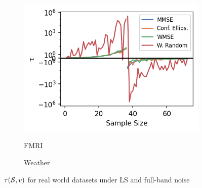 {\begin{figure}
    \centering
    \begin{subfigure}{0.31\columnwidth}
    \resizebox{\width}{0.62\columnwidth}
    {\includegraphics[width=\columnwidth]{figures/proj1/plots/LS_threshold_real/fmri_subsample_500_367_bandwidth_36_thresholds_LS.png}}
    \caption{FMRI} 
    \label{snr_FMRI}
    \end{subfigure}
    \begin{subfigure}{0.31\columnwidth}
    \caption{Weather}%
    \label{snr_Weather}%
    \end{subfigure}
    \caption{$\tau(\mathcal{S},v)$ for real world datasets under LS and full-band noise}
\label{LS_SNR_Threshold_plots_all_real}
\end{figure}

}

